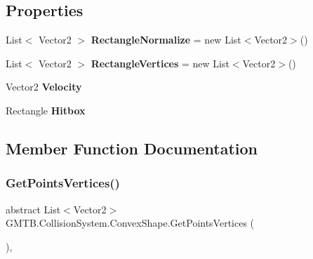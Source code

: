 \subsection*{Properties}
\begin{DoxyCompactItemize}
\item 
\mbox{\label{class_g_m_t_b_1_1_collision_system_1_1_convex_shape_aa6cc1b76c1009cd743eb4cf79da69306}} 
List$<$ Vector2 $>$ {\bfseries Rectangle\+Normalize} = new List$<$Vector2$>$()
\item 
\mbox{\label{class_g_m_t_b_1_1_collision_system_1_1_convex_shape_ac99a0114e15015f9cc9524d3e0f7efb8}} 
List$<$ Vector2 $>$ {\bfseries Rectangle\+Vertices} = new List$<$Vector2$>$()
\item 
\mbox{\label{class_g_m_t_b_1_1_collision_system_1_1_convex_shape_a0a96cfd4f2676e80bc05b200ee5f4420}} 
Vector2 {\bfseries Velocity}
\item 
\mbox{\label{class_g_m_t_b_1_1_collision_system_1_1_convex_shape_a8305395f6950d6ac588fc028dd86366b}} 
Rectangle {\bfseries Hitbox}
\end{DoxyCompactItemize}


\subsection{Member Function Documentation}
\mbox{\label{class_g_m_t_b_1_1_collision_system_1_1_convex_shape_a7748beb90c69edb0403c1c46ff99ac05}} 
\subsubsection{\texorpdfstring{GetPointsVertices()}{GetPointsVertices()}}
{\footnotesize\ttfamily abstract List$<$Vector2$>$ G\+M\+T\+B.\+Collision\+System.\+Convex\+Shape.\+Get\+Points\+Vertices (\begin{DoxyParamCaption}{ }\end{DoxyParamCaption})\hspace{0.3cm}{\ttfamily [protected]}, {}}



